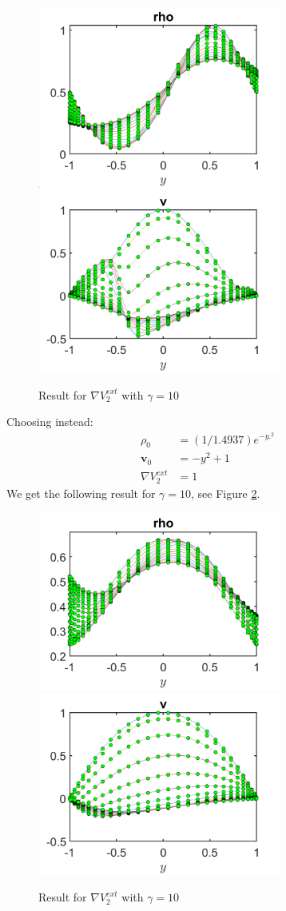 \documentclass[11pt, a4paper]{article}
\theoremstyle{definition}
\newcommand{\Stav}{\mathbf{v}}
\begin{document}
\begin{figure}
	\includegraphics[width=8cm]{rho6.png}
	\includegraphics[width=8cm]{v6.png}
	\caption{Result for $\nabla V^{ext}_2 $ with $\gamma =10$}
	\label{Figure6}
\end{figure}

Choosing instead:
\begin{align*}
\rho_0 &= (1/1.4937)e^{-y.^2}\\
\Stav_0 &=  -y^2 + 1\\
\nabla V^{ext}_2 &= 1
\end{align*}
We get the following result for $\gamma = 10$, see Figure \ref{Figure7}.

\begin{figure}
	\includegraphics[width=8cm]{rho7.png}
	\includegraphics[width=8cm]{v7.png}
	\caption{Result for $\nabla V^{ext}_2 $ with $\gamma =10$}
	\label{Figure7}
\end{figure}
\end{document}
